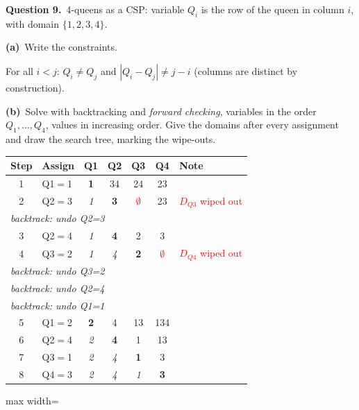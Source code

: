 \documentclass[11pt,a4paper]{article}
\newcommand{\question}[1]{\par\medskip\noindent\textbf{Question #1.}\ }
\newcommand{\subq}[1]{\par\smallskip\noindent\textbf{#1}\ }
\begin{document}
\question{9}4-queens as a CSP: variable $Q_i$ is the row of the queen in column $i$, with domain $\{1,2,3,4\}$.
\subq{(a)}Write the constraints.
\begin{solbox}
For all $i<j$: $Q_i\ne Q_j$ and $|Q_i-Q_j|\ne j-i$ (columns are distinct by construction).
\end{solbox}
\subq{(b)}Solve with backtracking and \emph{forward checking}, variables in the order $Q_1,\dots,Q_4$, values in increasing order. Give the domains after every assignment and draw the search tree, marking the wipe-outs.
\begin{solbox}
\begin{center}\small\begin{tabular}{c l c c c c  l}\toprule
Step & Assign & Q1 & Q2 & Q3 & Q4 & Note \\ \midrule
1 & Q1$=$1 & \textbf{1} & 34 & 24 & 23 &  \\
2 & Q2$=$3 & \textit{1} & \textbf{3} & \textcolor{red}{$\emptyset$} & 23 & \textcolor{red}{$D_{Q3}$ wiped out} \\
\multicolumn{6}{l}{\quad\textit{backtrack: undo Q2=3}} \\
3 & Q2$=$4 & \textit{1} & \textbf{4} & 2 & 3 &  \\
4 & Q3$=$2 & \textit{1} & \textit{4} & \textbf{2} & \textcolor{red}{$\emptyset$} & \textcolor{red}{$D_{Q4}$ wiped out} \\
\multicolumn{6}{l}{\quad\textit{backtrack: undo Q3=2}} \\
\multicolumn{6}{l}{\quad\textit{backtrack: undo Q2=4}} \\
\multicolumn{6}{l}{\quad\textit{backtrack: undo Q1=1}} \\
5 & Q1$=$2 & \textbf{2} & 4 & 13 & 134 &  \\
6 & Q2$=$4 & \textit{2} & \textbf{4} & 1 & 13 &  \\
7 & Q3$=$1 & \textit{2} & \textit{4} & \textbf{1} & 3 &  \\
8 & Q4$=$3 & \textit{2} & \textit{4} & \textit{1} & \textbf{3} &  \\
\bottomrule\end{tabular}\end{center}\begin{center}
\begin{adjustbox}{max width=\linewidth}
\end{adjustbox}
\end{center}
\end{solbox}
\end{document}
